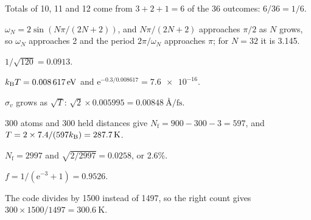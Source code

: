 \label{sec:sm-answers}

Totals of 10, 11 and 12 come from $3 + 2 + 1
= 6$ of the 36 outcomes: $6/36 = 1/6$.

$\omega_N = 2\sin(N\pi/(2N + 2))$, and $N\pi/(2N
+ 2)$ approaches $\pi/2$ as $N$ grows, so $\omega_N$ approaches 2 and the
period $2\pi/\omega_N$ approaches $\pi$; for $N = 32$ it is 3.145.

$1/\sqrt{120} = 0.0913$.

$k_{\mathrm{B}} T = \SI{0.008617}{\electronvolt}$ and
$\mathrm{e}^{-0.3/0.008617} = \num{7.6e-16}$.

$\sigma_v$ grows as $\sqrt T$:
$\sqrt2\times0.005995 = \SI{0.00848}{\angstrom\per\femto\second}$.

300 atoms and 300 held distances give
$N_{\mathrm f} = 900 - 300 - 3 = 597$, and $T = 2\times7.4/(597k_{\mathrm{B}}) =
\SI{287.7}{\kelvin}$.

$N_{\mathrm f} = 2997$ and $\sqrt{2/2997} =
0.0258$, or 2.6\%.

$f = 1/(\mathrm{e}^{-3} + 1) = 0.9526$.

The code divides by 1500 instead of 1497, so
the right count gives $300\times1500/1497 = \SI{300.6}{\kelvin}$.
